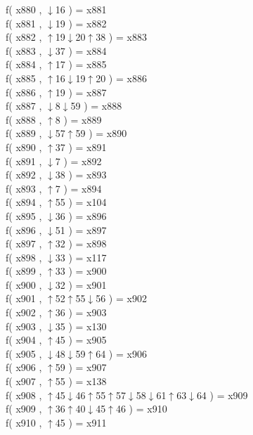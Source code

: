 f( x880 , $\downarrow$16 ) = x881 \\
f( x881 , $\downarrow$19 ) = x882 \\
f( x882 , $\uparrow$19$\downarrow$20$\uparrow$38 ) = x883 \\
f( x883 , $\downarrow$37 ) = x884 \\
f( x884 , $\uparrow$17 ) = x885 \\
f( x885 , $\uparrow$16$\downarrow$19$\uparrow$20 ) = x886 \\
f( x886 , $\uparrow$19 ) = x887 \\
f( x887 , $\downarrow$8$\downarrow$59 ) = x888 \\
f( x888 , $\uparrow$8 ) = x889 \\
f( x889 , $\downarrow$57$\uparrow$59 ) = x890 \\
f( x890 , $\uparrow$37 ) = x891 \\
f( x891 , $\downarrow$7 ) = x892 \\
f( x892 , $\downarrow$38 ) = x893 \\
f( x893 , $\uparrow$7 ) = x894 \\
f( x894 , $\uparrow$55 ) = x104 \\
f( x895 , $\downarrow$36 ) = x896 \\
f( x896 , $\downarrow$51 ) = x897 \\
f( x897 , $\uparrow$32 ) = x898 \\
f( x898 , $\downarrow$33 ) = x117 \\
f( x899 , $\uparrow$33 ) = x900 \\
f( x900 , $\downarrow$32 ) = x901 \\
f( x901 , $\uparrow$52$\uparrow$55$\downarrow$56 ) = x902 \\
f( x902 , $\uparrow$36 ) = x903 \\
f( x903 , $\downarrow$35 ) = x130 \\
f( x904 , $\uparrow$45 ) = x905 \\
f( x905 , $\downarrow$48$\downarrow$59$\uparrow$64 ) = x906 \\
f( x906 , $\uparrow$59 ) = x907 \\
f( x907 , $\uparrow$55 ) = x138 \\
f( x908 , $\uparrow$45$\downarrow$46$\uparrow$55$\uparrow$57$\downarrow$58$\downarrow$61$\uparrow$63$\downarrow$64 ) = x909 \\
f( x909 , $\uparrow$36$\uparrow$40$\downarrow$45$\uparrow$46 ) = x910 \\
f( x910 , $\uparrow$45 ) = x911 \\
